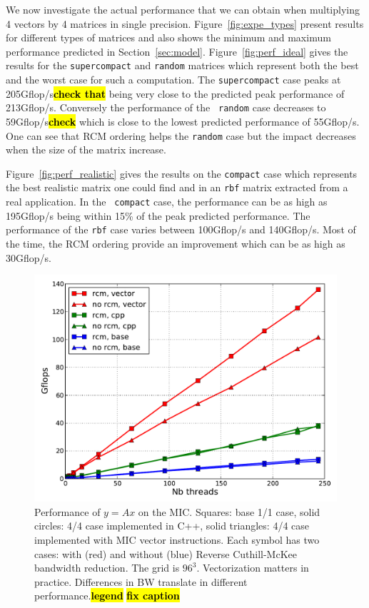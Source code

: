 \documentclass[10pt,conference,compsocconf]{IEEEtran}
\newcommand{\todo}[1]{{\color{red}\textbf{\hl{#1}}\xspace}}
\begin{document}
We now investigate the actual performance that we can obtain when
multiplying 4 vectors by 4 matrices in single
precision. Figure~\ref{fig:expe_types} present results for different
types of matrices and also shows the minimum and maximum performance
predicted in Section~\ref{sec:model}. Figure~\ref{fig:perf_ideal}
gives the results for the {\tt supercompact} and {\tt random} matrices
which represent both the best and the worst case for such a
computation. The {\tt supercompact} case peaks at
205Gflop/s\todo{check that} being very close to the predicted peak
performance of 213Gflop/s. Conversely the performance of the {\tt
  random} case decreases to 59Gflop/s\todo{check} which is close to
the lowest predicted performance of 55Gflop/s. One can see that RCM
ordering helps the {\tt random} case but the impact decreases when the
size of the matrix increase.

Figure~\ref{fig:perf_realistic} gives the results on the {\tt compact}
case which represents the best realistic matrix one could find and in
an {\tt rbf} matrix extracted from a real application. In the {\tt
  compact} case, the performance can be as high as 195Gflop/s being
within 15\% of the peak predicted performance. The performance of the
{\tt rbf} case varies between 100Gflop/s and 140Gflop/s. Most of the
time, the RCM ordering provide an improvement which can be as high as
30Gflop/s.

\begin{figure}
  \centering 
  
  \includegraphics[width=.9\linewidth]{figures/mic_performance_nb_threads.pdf}

  \caption{Performance of $y=Ax$ on the MIC. Squares:
    base 1/1 case, solid circles: 4/4 case implemented in C++, solid
    triangles: 4/4 case implemented with MIC vector instructions. Each
    symbol has two cases: with (red) and without (blue) Reverse
    Cuthill-McKee bandwidth reduction. The grid is $96^3$. Vectorization matters in practice. Differences in BW
    translate in different performance.\todo{legend} \todo{fix caption}}
  \label{fig:comparison_spmv}
  \label{fig:perf_mic}
\end{figure}
\end{document}
